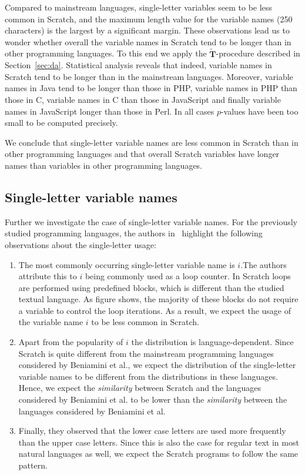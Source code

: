 \documentclass[conference]{IEEEtran}
\begin{document}
Compared to mainstream languages, single-letter variables seem to be less common in Scratch, and the maximum length value for the variable names (250 characters) is the largest by a significant margin. These observations lead us to wonder whether overall the variable names in Scratch tend to be longer than in other programming languages.
To this end we apply the $\widetilde{\mathbf{T}}$-procedure described in Section~\ref{sec:da}. 
Statistical analysis reveals that indeed, variable names in Scratch tend to be longer than in the mainstream languages.
Moreover, variable names in Java tend to be longer than those in PHP, variable names in  PHP than those in C, variable names in C than those in JavaScript and finally variable names in JavaScript longer than those in Perl. In all cases $p$-values have been too small to be computed precisely.

We conclude that single-letter variable names are less common in Scratch than in other programming languages and that overall Scratch variables have longer names than variables in other programming languages.

\subsection{Single-letter variable names}
Further we investigate the case of single-letter variable names. For the previously studied programming languages, the authors in~\cite{Beniamini} highlight the following observations about the single-letter usage: 

\begin{enumerate}
\item The most commonly occurring single-letter variable name is $i$.The authors attribute this to $i$ being commonly used as a loop counter. In Scratch loops are performed using predefined blocks, which is different than the studied textual language. As figure shows, the majority of these blocks do not require a variable to control the loop iterations. As a result, we expect the usage of the variable name $i$ to be less common in Scratch. \label{single-letter-vars:i}
\item Apart from the popularity of $i$ the distribution is language-dependent. Since Scratch is quite different from the mainstream programming languages considered by Beniamini et al., we expect the distribution of the single-letter variable names to be different from the distributions in these languages. Hence, we expect the \emph{similarity} between Scratch and the languages considered by Beniamini et al. to be lower than the \emph{similarity} between the languages considered by Beniamini et al. \label{single-letter-vars:similarity}
\item Finally, they observed that the lower case letters are used more frequently than the upper case letters. Since this is also the case for regular text in most natural languages as well, we expect the Scratch programs to follow the same pattern. \label{single-letter-vars:upercase:lowercase}
\end{enumerate}
\end{document}
